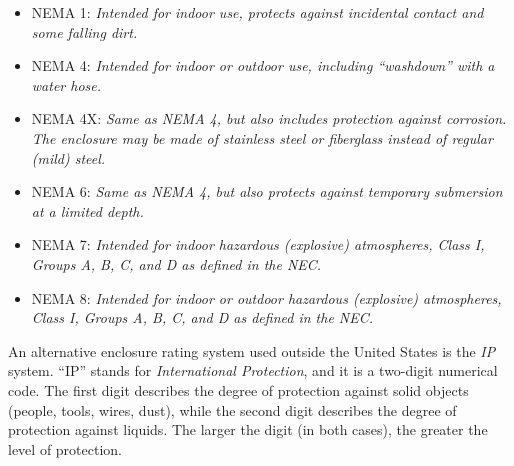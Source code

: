 \begin{itemize}
\item{} NEMA 1: {\it Intended for indoor use, protects against incidental contact and some falling dirt.}
\vskip 5pt 
\item{} NEMA 4: {\it Intended for indoor or outdoor use, including ``washdown'' with a water hose.}
\vskip 5pt 
\item{} NEMA 4X: {\it Same as NEMA 4, but also includes protection against corrosion.  The enclosure may be made of stainless steel or fiberglass instead of regular (mild) steel.}
\vskip 5pt 
\item{} NEMA 6: {\it Same as NEMA 4, but also protects against temporary submersion at a limited depth.}
\vskip 5pt 
\item{} NEMA 7: {\it Intended for indoor hazardous (explosive) atmospheres, Class I, Groups A, B, C, and D as defined in the NEC.}
\vskip 5pt 
\item{} NEMA 8: {\it Intended for indoor or outdoor hazardous (explosive) atmospheres, Class I, Groups A, B, C, and D as defined in the NEC.}
\end{itemize}

\vskip 10pt

An alternative enclosure rating system used outside the United States is the {\it IP} system.  ``IP'' stands for {\it International Protection}, and it is a two-digit numerical code.  The first digit describes the degree of protection against solid objects (people, tools, wires, dust), while the second digit describes the degree of protection against liquids.  The larger the digit (in both cases), the greater the level of protection.





